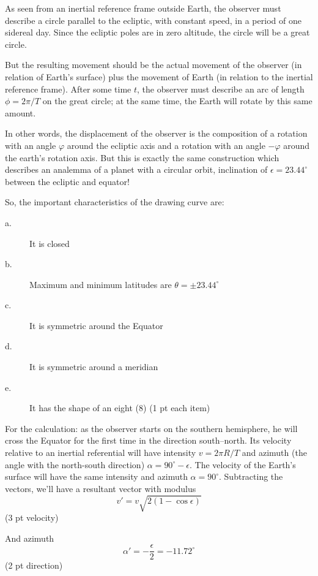 As seen from an inertial reference frame outside Earth, the observer must
describe a circle parallel to the ecliptic, with constant speed, in a period
of one sidereal day. Since the ecliptic poles are in zero altitude, the circle
will be a great circle.

But the resulting movement should be the actual movement of the observer (in
relation of Earth's surface) plus the movement of Earth (in relation to the
inertial reference frame). After some time $t$, the observer must describe an
arc of length $\phi = 2\pi/T$ %
on the great circle; at the same time, the Earth will rotate by this same
amount.

In other words, the displacement of the observer is the composition of a
rotation with an angle $\varphi$ around the ecliptic axis and a rotation with
an angle $-\varphi$ around the earth's rotation axis. But this is exactly the
same construction which describes an analemma of a planet with a circular
orbit, inclination of $\epsilon = 23.44^\circ$ between the ecliptic and
equator!

So, the important characteristics of the drawing curve are:
\begin{description}
\item[a.] It is closed
\item[b.] Maximum and minimum latitudes are $\theta = \pm 23.44^\circ$
\item[c.] It is symmetric around the Equator
\item[d.] It is symmetric around a meridian
\item[e.] It has the shape of an eight (8) \hfill(1 pt each item)
\end{description}

For the calculation: as the observer starts on the southern hemisphere, he
will cross the Equator for the first time in the direction south--north. Its
velocity relative to an inertial referential will have intensity
$v = 2\pi R/T$ and azimuth (the angle with the north-south direction)
$\alpha = 90^\circ - \epsilon$. The velocity of the Earth's surface will have
the same intensity and azimuth $\alpha = 90^\circ$. Subtracting the vectors,
we'll have a resultant vector with modulus
\[
  v' = v\sqrt{2(1 - \cos\epsilon)}
\]
\hfill(3 pt velocity)

And azimuth
\[
  \alpha' = -\frac{\epsilon}{2} = -11.72^\circ
\]
\hfill(2 pt direction)
